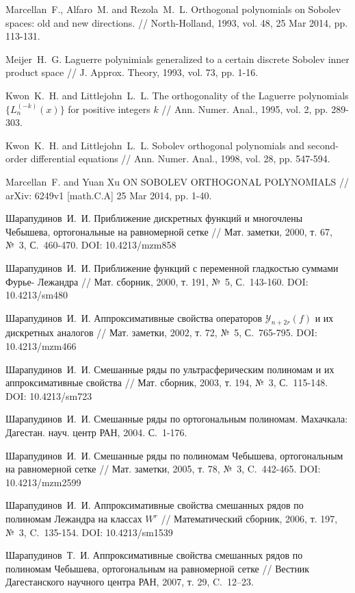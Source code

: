 \begin{thebibliography}{1}
 Marcellan~F., Alfaro~M. and Rezola~M.~L. Orthogonal polynomials on Sobolev spaces: old and new directions. // North-Holland, 1993, vol. 48, 25 Mar 2014, pp. 113-131.

 Meijer~H.~G. Laguerre polynimials generalized to a certain discrete Sobolev inner product space // J. Approx. Theory, 1993, vol. 73, pp. 1-16.

 Kwon~K.~H.  and Littlejohn~L.~L. The orthogonality of the Laguerre polynomials $\{L_n^{(-k)}(x)\}$ for positive integers $k$ // Ann. Numer. Anal., 1995, vol. 2, pp. 289-303.

 Kwon~K.~H. and Littlejohn~L.~L. Sobolev orthogonal polynomials and second-order differential equations // Ann. Numer. Anal., 1998, vol. 28, pp. 547-594.

 Marcellan~F. and Yuan Xu ON SOBOLEV ORTHOGONAL POLYNOMIALS // arXiv: 6249v1 [math.C.A] 25 Mar 2014, pp. 1-40.

 Шарапудинов~И.~И. Приближение дискретных функций и многочлены Чебышева, ортогональные на равномерной сетке // Мат. заметки, 2000, т. 67, №~3, С.~460-470. DOI: 10.4213/mzm858

 Шарапудинов~И.~И. Приближение функций с переменной гладкостью суммами Фурье- Лежандра // Мат. сборник, 2000, т. 191, №~5, С.~143-160. DOI: 10.4213/sm480

 Шарапудинов~И.~И. Аппроксимативные свойства операторов $\mathcal{Y}_{n+2r}(f)$ и их дискретных аналогов // Мат. заметки, 2002, т. 72, №~5, С.~765-795. DOI: 10.4213/mzm466

 Шарапудинов~И.~И. Смешанные ряды по ультрасферическим полиномам и их аппроксимативные свойства // Мат. сборник, 2003, т. 194, №~3, С.~115-148. DOI: 10.4213/sm723

 Шарапудинов~И.~И. Смешанные ряды по ортогональным полиномам. Махачкала: Дагестан. науч. центр РАН, 2004. С.~1-176.

 Шарапудинов~И.~И. Смешанные ряды по полиномам Чебышева, ортогональным на равномерной сетке // Мат. заметки, 2005, т. 78, №~3, C.~442-465. DOI: 10.4213/mzm2599

 Шарапудинов~И.~И. Аппроксимативные свойства смешанных рядов по полиномам Лежандра на классах $W^r$ // Математический сборник, 2006, т. 197, №~3, C.~135-154. DOI: 10.4213/sm1539

 Шарапудинов~Т.~И. Аппроксимативные свойства смешанных рядов по полиномам Чебышева, ортогональным на равномерной сетке // Вестник Дагестанского научного центра РАН, 2007, т. 29, C.~12–23.


\end{thebibliography}
